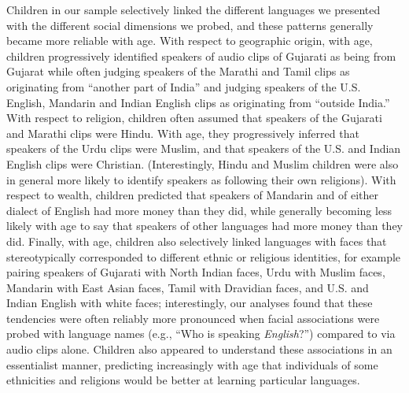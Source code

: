 \documentclass{foushee-adapted-preprint}
\begin{document}
Children in our sample selectively linked the different languages we presented with the different social dimensions we probed, and these patterns generally became more reliable with age. %
With respect to geographic origin, with age, children progressively identified speakers of audio clips of Gujarati as being from Gujarat while often judging speakers of the Marathi and Tamil clips as originating from ``another part of India'' and judging speakers of the U.S. English, Mandarin and Indian English clips as originating from ``outside India.'' 
With respect to religion, children often assumed that speakers of the Gujarati and Marathi clips were Hindu. With age, they progressively inferred that speakers of the Urdu clips were Muslim, and that speakers of the U.S. and Indian English clips were Christian. 
(Interestingly, Hindu and Muslim children were also in general more likely to identify speakers as following their own religions). 
With respect to wealth, children predicted that speakers of Mandarin and of either dialect of English had more money than they did, while generally becoming less likely with age to say that speakers of other languages had more money than they did. 
Finally, with age, children also selectively linked languages with faces that stereotypically corresponded to different ethnic or religious identities, for example pairing speakers of Gujarati with North Indian faces, Urdu with Muslim faces, Mandarin with East Asian faces, Tamil with Dravidian faces, and U.S. and Indian English with white faces; interestingly, our analyses found that these tendencies were often reliably more pronounced when facial associations were probed with language names (e.g., ``Who is speaking \textit{English}?'') compared to via audio clips alone. Children also appeared to understand these associations in an essentialist manner, predicting increasingly with age that individuals of some ethnicities and religions would be better at learning particular languages. 
\end{document}
